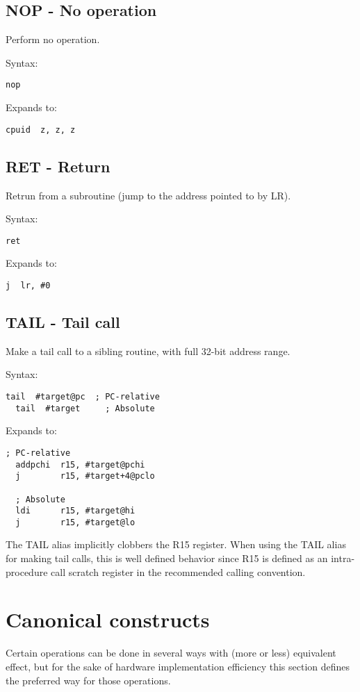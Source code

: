 \subsection{NOP - No operation}
\label{insn:NOP}

Perform no operation.

Syntax:
\begin{lstlisting}[style=assembler]
  nop
\end{lstlisting}

Expands to:
\begin{lstlisting}[style=assembler]
  cpuid  z, z, z
\end{lstlisting}

\subsection{RET - Return}
\label{insn:RET}

Retrun from a subroutine (jump to the address pointed to by LR).

Syntax:
\begin{lstlisting}[style=assembler]
  ret
\end{lstlisting}

Expands to:
\begin{lstlisting}[style=assembler]
  j  lr, #0
\end{lstlisting}

\subsection{TAIL - Tail call}
\label{insn:TAIL}

Make a tail call to a sibling routine, with full 32-bit address range.

Syntax:
\begin{lstlisting}[style=assembler]
  tail  #target@pc  ; PC-relative
  tail  #target     ; Absolute
\end{lstlisting}

Expands to:
\begin{lstlisting}[style=assembler]
  ; PC-relative
  addpchi  r15, #target@pchi
  j        r15, #target+4@pclo

  ; Absolute
  ldi      r15, #target@hi
  j        r15, #target@lo
\end{lstlisting}

\begin{notebox}
The TAIL alias implicitly clobbers the R15 register. When using the TAIL alias
for making tail calls, this is well defined behavior since R15 is defined as an
intra-procedure call scratch register in the recommended calling convention.
\end{notebox}

\section{Canonical constructs}

Certain operations can be done in several ways with (more or less) equivalent
effect, but for the sake of hardware implementation efficiency this section
defines the preferred way for those operations.

\tbd

